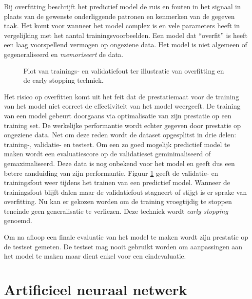 \npar Bij overfitting beschrijft het predictief model de ruis en fouten in het signaal in plaats van de gewenste onderliggende patronen en kenmerken van de gegeven taak. Het komt voor wanneer het model complex is en vele parameters heeft in vergelijking met het aantal trainingsvoorbeelden. Een model dat ``overfit'' is heeft een laag voorspellend vermogen op ongeziene data. Het model is niet algemeen of gegeneraliseerd en  \textit{memoriseert} de data. 

\begin{figure}
	\centering
	\def\svgscale{0.7}
	
	\caption{Plot van trainings- en validatiefout ter illustratie van overfitting en de early stopping techniek.}
	\label{fig:overfitting}
\end{figure}

\npar Het risico op overfitten komt uit het feit dat de prestatiemaat voor de training van het model niet correct de effectiviteit van het model weergeeft. De training van een model gebeurt doorgaans via optimalisatie van zijn prestatie op een training set. De werkelijke performantie wordt echter gegeven door prestatie op ongeziene data. Net om deze reden wordt de dataset opgesplitst in drie delen: training-, validatie- en testset.
\npar Om een zo goed mogelijk predictief model te maken wordt een evaluatiescore op de validatieset geminimaliseerd of gemaximaliseerd. Deze data is nog onbekend voor het model en geeft dus een betere aanduiding van zijn performantie. Figuur \ref{fig:overfitting} geeft de validatie- en trainingsfout weer tijdens het trainen van een predictief model. Wanneer de trainingsfout blijft dalen maar de validatiefout stagneert of stijgt is er sprake van overfitting. Nu kan er gekozen worden om de training vroegtijdig te stoppen teneinde geen generalisatie te verliezen. Deze techniek wordt \textit{early stopping} genoemd.

\npar Om na afloop een finale evaluatie van het model te maken wordt zijn prestatie op de testset gemeten. De testset mag nooit gebruikt worden om aanpassingen aan het model te maken maar dient enkel voor een eindevaluatie.







\section{Artificieel neuraal netwerk}\label{sec:ann}
